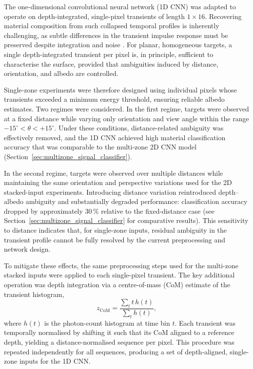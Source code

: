 \documentclass[12pt,a4paper,oneside]{report}
\begin{document}
The one-dimensional convolutional neural network (1D CNN) was adapted to operate on depth-integrated, single-pixel transients of length $1 \times 16$. Recovering material composition from such collapsed temporal profiles is inherently challenging, as subtle differences in the transient impulse response must be preserved despite integration and noise \cite{su2016,becker2023}. For planar, homogeneous targets, a single depth-integrated transient per pixel is, in principle, sufficient to characterise the surface, provided that ambiguities induced by distance, orientation, and albedo are controlled.

Single-zone experiments were therefore designed using individual pixels whose transients exceeded a minimum energy threshold, ensuring reliable albedo estimates. Two regimes were considered. In the first regime, targets were observed at a fixed distance while varying only orientation and view angle within the range $-15^{\circ} < \theta < +15^{\circ}$. Under these conditions, distance-related ambiguity was effectively removed, and the 1D CNN achieved high material classification accuracy that was comparable to the multi-zone 2D CNN model (Section~\ref{sec:multizone_signal_classifier}).

In the second regime, targets were observed over multiple distances while maintaining the same orientation and perspective variations used for the 2D stacked-input experiments. Introducing distance variation reintroduced depth--albedo ambiguity and substantially degraded performance: classification accuracy dropped by approximately $30\,\%$ relative to the fixed-distance case (see Section~\ref{sec:multizone_signal_classifier} for comparative results). This sensitivity to distance indicates that, for single-zone inputs, residual ambiguity in the transient profile cannot be fully resolved by the current preprocessing and network design.

To mitigate these effects, the same preprocessing steps used for the multi-zone stacked inputs were applied to each single-pixel transient. The key additional operation was depth integration via a centre-of-mass (CoM) estimate of the transient histogram,
\begin{equation}
z_{\mathrm{CoM}} = \frac{\sum_{t} t\,h(t)}{\sum_{t} h(t)},
\label{eq:com_depth_alignment}
\end{equation}
where $h(t)$ is the photon-count histogram at time bin $t$. Each transient was temporally normalised by shifting it such that its CoM aligned to a reference depth, yielding a distance-normalised sequence per pixel. This procedure was repeated independently for all sequences, producing a set of depth-aligned, single-zone inputs for the 1D CNN.
\end{document}
